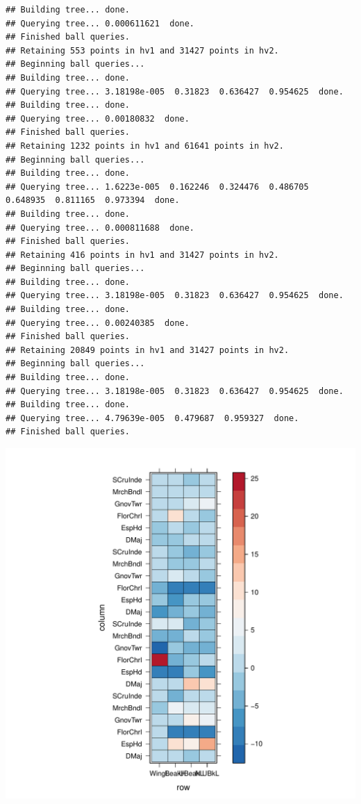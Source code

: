 \documentclass[12pt]{article}\usepackage[]{graphicx}\usepackage[]{color}
\makeatletter
\def\maxwidth{ %
  \ifdim\Gin@nat@width>\linewidth
    \linewidth
  \else
    \Gin@nat@width
  \fi
}
\newenvironment{kframe}{%
 \def\at@end@of@kframe{}%
 \ifinner\ifhmode%
  \def\at@end@of@kframe{\end{minipage}}%
  \begin{minipage}{\columnwidth}%
 \fi\fi%
 \def\FrameCommand##1{\hskip\@totalleftmargin \hskip-\fboxsep
 \colorbox{shadecolor}{##1}\hskip-\fboxsep
     \hskip-\linewidth \hskip-\@totalleftmargin \hskip\columnwidth}%
 \MakeFramed {\advance\hsize-\width
   \@totalleftmargin\z@ \linewidth\hsize
   \@setminipage}}%
 {\par\unskip\endMakeFramed%
 \at@end@of@kframe}
\newenvironment{knitrout}{}{} %
\makeatother
\begin{document}
\begin{knitrout}
\begin{kframe}
\begin{verbatim}
## Building tree... done.
## Querying tree... 0.000611621  done.
## Finished ball queries. 
## Retaining 553 points in hv1 and 31427 points in hv2.
## Beginning ball queries... 
## Building tree... done.
## Querying tree... 3.18198e-005  0.31823  0.636427  0.954625  done.
## Building tree... done.
## Querying tree... 0.00180832  done.
## Finished ball queries. 
## Retaining 1232 points in hv1 and 61641 points in hv2.
## Beginning ball queries... 
## Building tree... done.
## Querying tree... 1.6223e-005  0.162246  0.324476  0.486705  0.648935  0.811165  0.973394  done.
## Building tree... done.
## Querying tree... 0.000811688  done.
## Finished ball queries. 
## Retaining 416 points in hv1 and 31427 points in hv2.
## Beginning ball queries... 
## Building tree... done.
## Querying tree... 3.18198e-005  0.31823  0.636427  0.954625  done.
## Building tree... done.
## Querying tree... 0.00240385  done.
## Finished ball queries. 
## Retaining 20849 points in hv1 and 31427 points in hv2.
## Beginning ball queries... 
## Building tree... done.
## Querying tree... 3.18198e-005  0.31823  0.636427  0.954625  done.
## Building tree... done.
## Querying tree... 4.79639e-005  0.479687  0.959327  done.
## Finished ball queries.
\end{verbatim}
\end{kframe}
\includegraphics[width=\maxwidth]{figure/unnamed-chunk-571} 


\end{knitrout}
\end{document}
